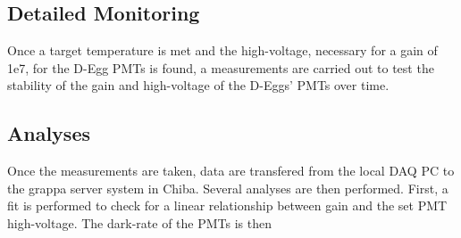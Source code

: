 \documentclass[main.tex]{subfiles}
\begin{document}
\subsection{Detailed Monitoring}

Once a target temperature is met and the high-voltage, necessary for a gain of 1e7, for the D-Egg PMTs is found, a measurements are carried out to test the stability of the gain and high-voltage of the D-Eggs' PMTs over time. 

\subsection{Analyses}

Once the measurements are taken, data are transfered from the local DAQ PC to the grappa server system in Chiba. Several analyses are then performed. 
First, a fit is performed to check for a linear relationship between gain and the set PMT high-voltage.  
The dark-rate of the PMTs is then 
\end{document}
